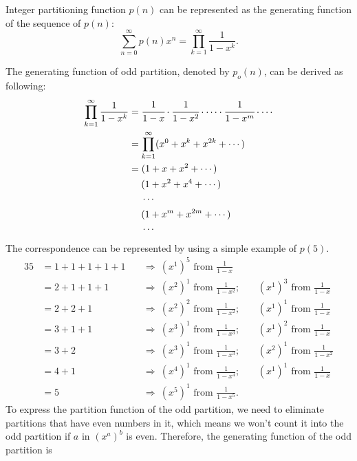 \documentclass[aps,onecolumn,superscriptaddress,preprintnumbers]{revtex4-2}
\begin{document}
Integer partitioning function $p(n)$ can be represented as the generating function of the sequence of $p(n)$:
\begin{equation}
\sum_{n=0}^{\infty}p(n)x^n = \prod_{k=1}^{\infty}\frac{1}{1-x^k}.
\end{equation}

The generating function of odd partition, denoted by $p_o(n)$, can be derived as following:
\begin{align*}
\prod_{k=1}^{\infty}\frac{1}{1-x^k} &= \cfrac{1}{1-x} \cdot \cfrac{1}{1-x^2} \cdot \cdots \cdot \cfrac{1}{1-x^m} \cdot \cdots\\
&= \prod_{k=1}^{\infty}(x^0+x^k+x^{2k}+\cdots)\\
&= (1+x+x^2+\cdots )\\
&\hspace{13pt}(1+x^2+x^4+\cdots )\\
&\hspace{13pt}\cdots\\
&\hspace{13pt}(1+x^m+x^{2m}+\cdots )\\
&\hspace{13pt}\cdots
\end{align*}
The correspondence can be represented by using a simple example of $p(5)$.
\begin{alignat*}{3}
5&=1+1+1+1+1&&~\Longrightarrow~ (x^1)^5 \text{~from~} \frac{1}{1-x}\\
&=2+1+1+1&&~\Longrightarrow~ (x^2)^1 \text{~from~} \frac{1}{1-x^2}; ~&&(x^1)^3 \text{~from~} \frac{1}{1-x}\\
&=2+2+1&&~\Longrightarrow~ (x^2)^2 \text{~from~} \frac{1}{1-x^2}; &&(x^1)^1 \text{~from~} \frac{1}{1-x}\\
&=3+1+1&&~\Longrightarrow~ (x^3)^1 \text{~from~} \frac{1}{1-x^3}; &&(x^1)^2 \text{~from~} \frac{1}{1-x}\\
&=3+2&&~\Longrightarrow~ (x^3)^1 \text{~from~} \frac{1}{1-x^3}; &&(x^2)^1\text{~from~} \frac{1}{1-x^2}\\
&=4+1&&~\Longrightarrow~ (x^4)^1 \text{~from~} \frac{1}{1-x^4}; &&(x^1)^1 \text{~from~} \frac{1}{1-x}\\
&=5 &&~\Longrightarrow~ (x^5)^1 \text{~from~} \frac{1}{1-x^5}.
\end{alignat*}
To express the partition function of the odd partition, we need to eliminate partitions that have even numbers in it, which means we won't count it into the odd partition if $a$ in $(x^a)^b$ is even. Therefore, the generating function of the odd partition is
\end{document}
